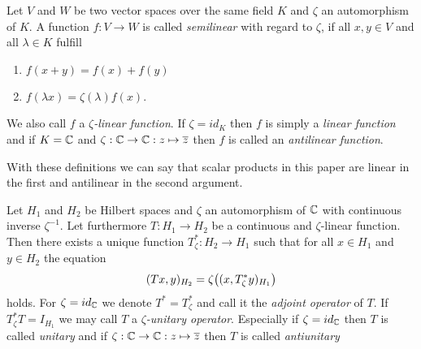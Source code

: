 \begin{definition}
	Let $V$ and $W$ be two vector spaces over the same field $K$ and $\zeta$ an automorphism of $K$. A function $f: V \to W$ is called \textit{semilinear} with regard to $\zeta$, if all $x,y \in V$ and all $\lambda \in K$ fulfill
	\begin{enumerate}
		\item $f(x + y) = f(x) + f(y)$
		\item $f(\lambda x) = \zeta(\lambda) f(x)$.
	\end{enumerate}
	We also call $f$ a $\zeta$\textit{-linear function}. If $\zeta = id_K$ then $f$ is simply a \textit{linear function} and if $K = \mathbb{C}$ and $\zeta: \mathbb{C} \to \mathbb{C}: z \mapsto \overline{z}$ then $f$ is called an \textit{antilinear function}. 
\end{definition}

With these definitions we can say that scalar products in this paper are linear in the first and antilinear in the second argument. 

\begin{lemma}
	Let $H_1$ and $H_2$ be Hilbert spaces and $\zeta$ an automorphism of $\mathbb{C}$ with continuous inverse $\zeta^{-1}$. Let furthermore $T: H_1 \to H_2$ be a continuous and $\zeta$-linear function. Then there exists a unique function $T_\zeta^\ast: H_2 \to H_1$ such that for all $x \in H_1$ and $y \in H_2$ the equation 
	\begin{align*}
		(Tx, y)_{H_2} = \zeta{\left ( (x, T_\zeta^\ast y)_{H_1} \right )}
	\end{align*}
	holds. For $\zeta = id_{\mathbb{C}}$ we denote $T^\ast = T_\zeta^\ast$ and call it the \textit{adjoint operator} of $T$. If $T_\zeta^\ast T = I_{H_1}$ we may call $T$ a $\zeta$\textit{-unitary operator}. Especially if $\zeta = id_{\mathbb{C}}$ then $T$ is called \textit{unitary} and if $\zeta: \mathbb{C} \to \mathbb{C}: z \mapsto \overline{z}$ then $T$ is called \textit{antiunitary}
\end{lemma}

